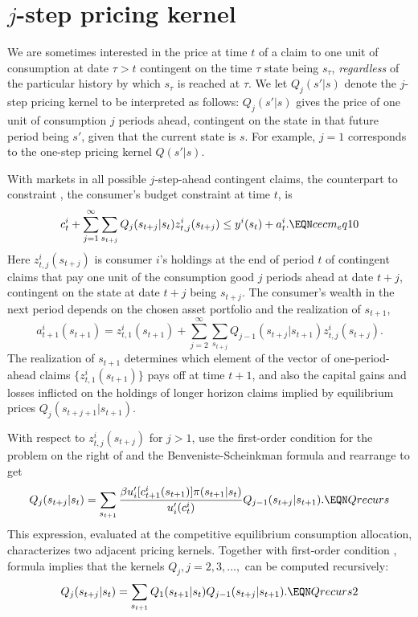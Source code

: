 \section{$j$-step pricing kernel}\label{sec:multi-step}%
We are sometimes interested in the price at time $t$ of a claim to
one unit of consumption at date $\tau >t $ contingent on the
time $\tau$ state being $s_\tau$, {\it regardless\/} of the
particular history by which $s_\tau$ is reached at $\tau$.  We let
$Q_j(s' | s)$ denote the $j$-step pricing kernel to be interpreted
as follows: $Q_j(s' | s)$ gives the price of one unit of
consumption $j$ periods ahead, contingent on the state in that
future period being $s'$, given that the current state is $s$. For
example, $j=1$ corresponds to the one-step pricing kernel $Q(s' |
s)$.


With markets in all possible $j$-step-ahead contingent claims,
the counterpart to constraint , the consumer's budget
constraint at time $t$, is
$$ c_t^i + \sum_{j=1}^\infty \sum_{ s_{t+j}} Q_j( s_{t+j} | s_t)
   z^i_{t,j}( s_{t+j}) \leq  y^i(s_t) + a_t^i. \EQN cecm_eq10   $$
Here $z^i_{t,j}( s_{t+j})$ is consumer $i$'s holdings at
the end of period $t$ of contingent claims that pay one unit of
the consumption good $j$ periods ahead at date $t+j$, contingent on
the state at date $t+j$ being $ s_{t+j}$. The consumer's
wealth in the next period  depends on the chosen asset portfolio
and the realization of $s_{t+1}$,
$$
a^i_{t+1}(s_{t+1}) = z^i_{t,1}(s_{t+1})
   + \sum_{j=2}^\infty \sum_{ s_{t+j}}  Q_{j-1}( s_{t+j} | s_{t+1})
           z^i_{t,j}( s_{t+j}) .
$$
The realization of $s_{t+1}$ determines which element of the vector of
one-period-ahead claims $\{z^i_{t,1}( s_{t+1})\}$  pays off at
time $t+1$,
and also the capital gains and losses inflicted on the holdings of longer horizon
claims implied by equilibrium prices $Q_j( s_{t+j+1} | s_{t+1})$.


With respect to $z^i_{t,j}( s_{t+j})$ for $j>1$,
use the first-order condition for the problem on the right of 
and the Benveniste-Scheinkman formula and rearrange to get
$$ Q_j( s_{t+j} | s_t ) = \sum_{s_{t+1}}
   {\beta u'_i[c^i_{t+1}(s_{t+1})] \pi(s_{t+1} | s_t) \over u'_i(c_t^i) }
   Q_{j-1}( s_{t+j} | s_{t+1} ).             \EQN Qrecurs $$
This expression, evaluated at the competitive equilibrium
consumption allocation, characterizes two adjacent pricing
kernels. Together with first-order
condition , formula   implies that the
kernels $Q_j, j = 2, 3, \ldots,$ can be computed recursively:
$$ Q_j( s_{t+j} | s_t) = \sum_{s_{t+1}} Q_1(s_{t+1} | s_t)
                      Q_{j-1}( s_{t+j} | s_{t+1}). \EQN Qrecurs2 $$




